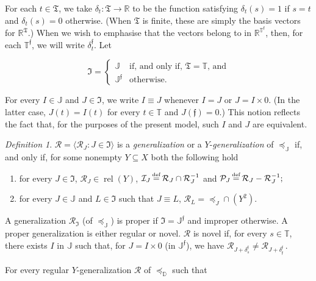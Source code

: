 \documentclass[ecta,nameyear,draft]{econsocart}
\newcommand{\bs}{-}%
\newcommand{\R}{\mathbb R}
\newcommand{\mc}{\mathcal}
\newcommand\defeq{\mathrel{\overset{\makebox[0pt]{\mbox{\normalfont\tiny def}}}{=}}}%
\newcommand{\relations}{\operatorname{rel}}
\newcommand{\novel}{\mathfrak f}
\newcommand{\preceqb}{\mathbin{\preceq}}
\newcommand{\ext}{\mathrel{\mc R}}
\newcommand{\extb}{\mathbin{\mc R}}
\newcommand{\sextb}{\mathbin{\mc P}}
\newcommand{\nextb}{\mathbin{\mc I}}
\newcommand{\mbbd}{{\mathds D}}
\newcommand{\mbbt}{{\mathds {T}}}
\newcommand{\mbbtp}{{\mathds{T}^\novel}}
\newcommand{\mbbtpp}{{\mathfrak{T}}}
\newcommand{\mbbj}{\mathds J}
\newcommand{\mbbjp}{{\mathds {J}^{\novel}}}
\newcommand{\mbbjpp}{\mathfrak{I}}
\theoremstyle{plain}
\theoremstyle{remark}
\newtheorem{definition}{Definition}%
\begin{document}
\begin{appendix}
  For each $t \in \mbbtpp$, we take $\delta_{t} : \mbbtpp \rightarrow \R$ to be
  the function satisfying $\delta_{t} ( s ) = 1$ if $s = t$ and $\delta_{t} (s)
  = 0$ otherwise. (When $\mbbtpp$ is finite, these are simply the basis vectors
  for $\R^{\mbbtpp}$.)  When we wish to emphasise that the vectors belong to in
  $\R^{\mbbtp}$, then, for each $\mbbtp$, we will write $\delta_{t}^{\novel}$.
  Let
  \begin{linenomath*}
    \begin{equation*}
      \text{$\mbbjpp$} = \left \{
        \begin{array}{ll}
          \mbbj & \text{if, and only if, $\mbbtpp = \mbbt$, and} \\
          \mbbjp & \text{otherwise.}
      \end{array}\right.
    \end{equation*}
  \end{linenomath*}
  For every $I \in \mbbj$ and $J \in \mbbjpp$, we write $I \equiv J$ whenever
  $I
  = J$ or $J = I\times 0$. (In the latter case, $J(t)= I(t)$ for every $t\in
  \mbbt$ and $J(\novel )= 0$.) This notion reflects the fact that, for the
  purposes of the present model, such $I$ and $J$ are equivalent.
  \begin{definition}\label{def-generalizationQ} $\extb =\langle \extb_{J}: J
    \in \mbbjpp \rangle$ is a \emph{generalization} or a
    $Y$-\emph{generalization} of $\preceqb _{\mbbj}$ if, and only if, for
    some nonempty $Y \subseteq X$ both the following hold
    \begin{enumerate}
      \item for every $J\in \mbbjpp$, $\extb_{J}\in \relations(Y)$, $\nextb_{J}
        \defeq \extb_{J} \cap \extb_{J}^{-1}$ and $\sextb_{J} \defeq \extb_{J}
        \bs \extb_{J}^{-1};$
      \item for every $J \in \mbbj$ and $L \in \mbbjpp$ such that $J \equiv L$,
        $\extb_{L} = \preceqb_{J} \cap (Y^2)$. \label{item-preservingQ}
    \end{enumerate}
    A generalization $\ext_{\mbbjpp}$ (of $\preceq_{\mbbj}$) is proper if
    $\mbbjpp= \mbbjp$ and improper otherwise.  A proper generalization is
    either regular or novel. $\ext$ is novel if, for every $s \in \mbbt$, there
    exists $I$ in $\mbbj$ such that, for $J = I \times 0$ (in $\mbbjp$), we
    have $\extb _ {J + \delta _{s}^{\novel}} \neq \extb _ {J + \delta _
    {\novel}^{\novel} }$\,.
  \end{definition} 
  For every regular $Y$-generalization $\ext$ of $\preceq_{\mbbd}$ such that

\end{appendix}
\end{document}
